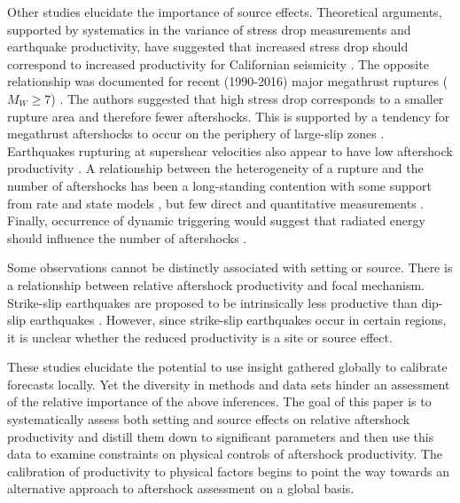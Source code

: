 \documentclass[draft, jgrga]{agujournal2018}
\begin{document}
Other studies elucidate the importance of source effects. Theoretical arguments, supported by systematics in the variance of stress drop measurements and earthquake productivity, have suggested that increased stress drop should correspond to increased productivity for Californian seismicity \citep{Marsan2017HowAftershocks}. The opposite relationship was documented for recent (1990-2016) major megathrust ruptures ($M_W \ge 7$) \citep{Wetzler2016}. The authors suggested that high stress drop corresponds to a smaller rupture area and therefore fewer aftershocks. This is supported by a tendency for megathrust aftershocks to occur on the periphery of large-slip zones \citep{Wetzler2016}. Earthquakes rupturing at supershear velocities also appear to have low aftershock productivity \citep{Bouchon2008TheEarthquakes}. A relationship between the heterogeneity of a rupture and the number of aftershocks has been a long-standing contention \citep{Mogi1967, Yamanaka1990scalingshock} with some support from rate and state models \citep{Helmstetter2006RelationModel, Marsan2006}, but few direct and quantitative measurements \citep{Das2003SpatialDistribution, Houston2004}. Finally, occurrence of dynamic triggering would suggest that radiated energy should influence the number of aftershocks \citep{felzer2006decay}.

Some observations cannot be distinctly associated with setting or source. There is a relationship between relative aftershock productivity and focal mechanism. Strike-slip earthquakes are proposed to be intrinsically less productive than dip-slip earthquakes \citep{Tahir2012, Tahir2014Aftershock2005, Tahir2015}. However, since strike-slip earthquakes occur in certain regions, it is unclear whether the reduced productivity is a site or source effect.

These studies elucidate the potential to use insight gathered globally to calibrate forecasts locally. Yet the diversity in methods and data sets hinder an assessment of the relative importance of the above inferences. The goal of this paper is to systematically assess both setting and source effects on relative aftershock productivity and distill them down to significant parameters and then use this data to examine constraints on physical controls of aftershock productivity.  The calibration of productivity to physical factors begins to point the way towards an alternative approach to aftershock assessment on a global basis.
\end{document}

